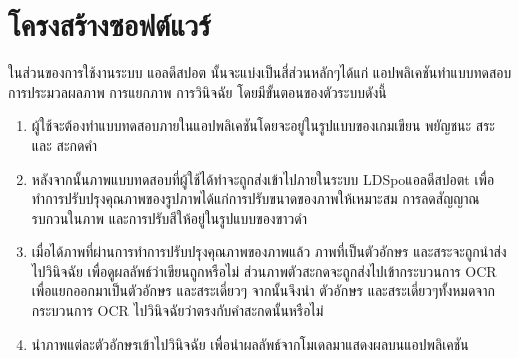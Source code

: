 \documentclass[12pt,oneside,openright,a4paper]{cpe-thai-project}
\begin{document}
\section{โครงสร้างซอฟต์แวร์}
ในส่วนของการใช้งานระบบ แอลดีสปอต นั้นจะแบ่งเป็นสี่ส่วนหลักๆได้แก่ แอปพลิเคชันทำแบบทดสอบ การประมวลผลภาพ การแยกภาพ การวินิจฉัย โดยมีขั้นตอนของตัวระบบดังนี้
\begin{enumerate}
  \item ผู้ใช้จะต้องทำแบบทดสอบภายในแอปพลิเคชันโดยจะอยู่ในรูปแบบของเกมเขียน พยัญชนะ สระ และ สะกดคำ
  \item หลังจากนั้นภาพแบบทดสอบที่ผู้ใช้ได้ทำจะถูกส่งเข้าไปภายในระบบ LDSpoแอลดีสปอตt เพื่อทำการปรับปรุงคุณภาพของรูปภาพได้แก่การปรับขนาดของภาพให้เหมาะสม การลดสัญญาณรบกวนในภาพ และการปรับสีให้อยู่ในรูปแบบของขาวดำ
  \item เมื่อได้ภาพที่ผ่านการทำการปรับปรุงคุณภาพของภาพแล้ว ภาพที่เป็นตัวอักษร และสระจะถูกนำส่งไปวินิจฉัย เพื่อดูผลลัพธ์ว่าเขียนถูกหรือไม่ ส่วนภาพตัวสะกดจะถูกส่งไปเข้ากระบวนการ OCR เพื่อแยกออกมาเป็นตัวอักษร และสระเดี่ยวๆ จากนั้นจึงนำ ตัวอักษร และสระเดี่ยวๆทั้งหมดจากกระบวนการ OCR ไปวินิจฉัยว่าตรงกับคำสะกดนั้นหรือไม่
  \item นำภาพแต่ละตัวอักษรเข้าไปวินิจฉัย เพื่อนำผลลัพธ์จากโมเดลมาแสดงผลบนแอปพลิเคชัน
\end{enumerate}
\end{document}
